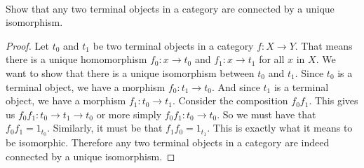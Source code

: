 \documentclass[main.tex]{subfiles}
\begin{document}
\paragraph{}
\begin{exercise}
	Show that any two terminal objects in a category are connected by a unique
	isomorphism.
\end{exercise}

\begin{proof}
Let $t_0$ and $t_1$ be two terminal objects in a category $f\colon X \rightarrow Y$.
That means there is a unique homomorphism $f_0\colon x \rightarrow t_0$ and $f_1\colon x
\rightarrow t_1$ for all $x$ in $X$. We want to show that there is a unique
isomorphism between $t_0$ and $t_1$.
Since $t_0$ is a terminal object, we have a morphism $f_0\colon t_1 \rightarrow t_0$.
And since $t_1$ is a terminal object, we have a morphism $f_1\colon t_0 \rightarrow
t_1$. Consider the composition $f_0 f_1$. This gives us $f_0 f_1\colon t_0
\rightarrow t_1 \rightarrow t_0$ or more simply $f_0 f_1\colon t_0 \rightarrow t_0$.
So we must have that $f_0 f_1 = 1_{t_0}$. Similarly, it must be that $f_1 f_0 =
1_{t_1}$. This is exactly what it means to be isomorphic.
Therefore any two terminal objects in a category are indeed connected by a
unique isomorphism.
\end{proof}
\end{document}
